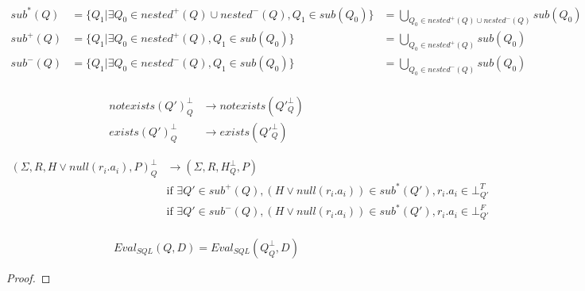 \begin{mydef}
	\begin{align*}
		sub^*(Q) & = \{Q_1|\exists Q_0 \in nested^+(Q) \cup nested^-(Q), Q_1 \in sub(Q_0)\} &  = \bigcup_{Q_0 \in nested^+(Q) \cup nested^-(Q)}{sub(Q_0)} \\
		sub^+(Q) & = \{Q_1|\exists Q_0 \in nested^+(Q), Q_1 \in sub(Q_0)\} &  = \bigcup_{Q_0 \in nested^+(Q)}{sub(Q_0)}\\
		sub^-(Q) & = \{Q_1|\exists Q_0 \in nested^-(Q), Q_1 \in sub(Q_0)\} &  = \bigcup_{Q_0 \in nested^-(Q)}{sub(Q_0)}\\
	\end{align*}
\end{mydef}

\begin{mydef}
	\begin{align*}
		notexists(Q')^\bot_Q & \rightarrow notexists(Q'^\bot_Q)
		\\exists(Q')^\bot_Q & \rightarrow exists(Q'^\bot_Q)
	\end{align*}
\end{mydef}

\begin{mydef}
	\begin{align*}
		(\Sigma,R,H \lor null(r_i.a_i),P)^\bot_Q & \rightarrow (\Sigma,R,H^\bot_{Q},P) \\
		& \mbox{if } \exists Q' \in sub^+(Q), (H\lor null(r_i.a_i)) \in sub^*(Q'), r_i.a_i \in \bot^T_{Q'} \\
		& \mbox{if } \exists Q' \in sub^-(Q), (H\lor null(r_i.a_i)) \in sub^*(Q'), r_i.a_i \in \bot^F_{Q'} \\
	\end{align*}
\end{mydef}

\begin{myprop}
	$$Eval_{SQL}(Q,D) = Eval_{SQL}(Q^\bot_Q,D)$$
\end{myprop}

\begin{proof}
	
\end{proof}